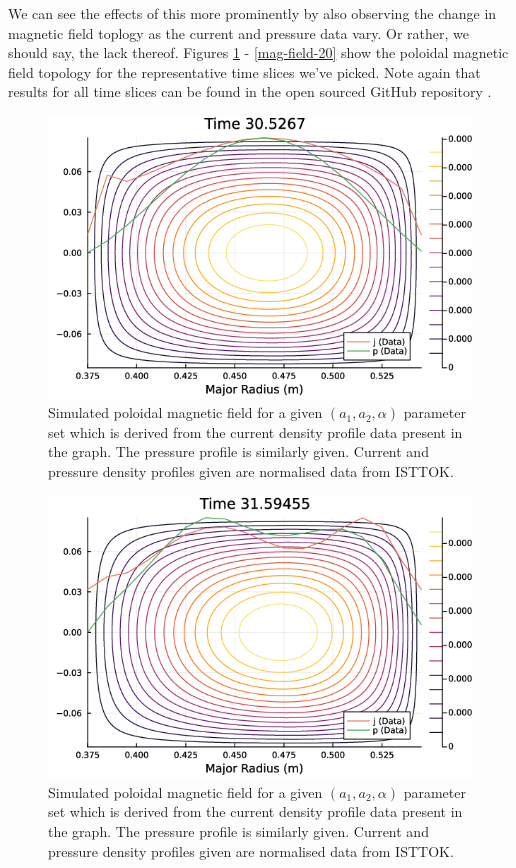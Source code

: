We can see the effects of this more prominently by also observing the change in magnetic field toplogy 
as the current and pressure data vary. Or rather, we should say, the lack thereof. Figures \ref{mag-field-0} - \ref{mag-field-20}
show the poloidal magnetic field topology for the representative time slices we've picked. Note again that results for all 
time slices can be found in the open sourced GitHub repository \cite{project-source}.

\begin{figure}[h!]
    \centering
    \includegraphics[scale=0.7]{imgs/c5/magnetic-field-0.png}
    \caption{Simulated poloidal magnetic field for a given $(a_1, a_2, \alpha)$ parameter set which is derived 
    from the current density profile data present in the graph. The pressure profile is similarly given. Current and 
    pressure density profiles given are normalised data from ISTTOK.}
    \label{mag-field-0}
\end{figure}\newpage

\begin{figure}[h!]
    \centering
    \includegraphics[scale=0.55]{imgs/c5/magnetic-field-15.png}
    \caption{Simulated poloidal magnetic field for a given $(a_1, a_2, \alpha)$ parameter set which is derived 
    from the current density profile data present in the graph. The pressure profile is similarly given. Current and 
    pressure density profiles given are normalised data from ISTTOK.}
    \label{mag-field-15}
\end{figure}


